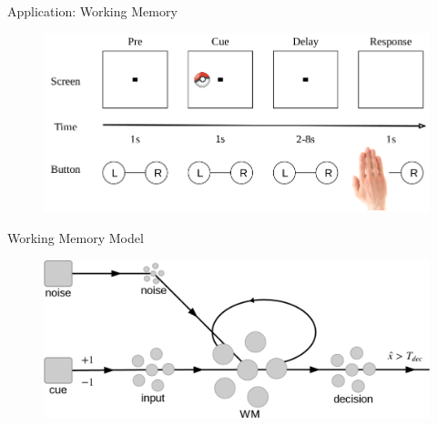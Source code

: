 \documentclass[aspectratio=169]{beamer}
\begin{document}
\begin{frame}{Application: Working Memory}
  \begin{figure}
  \centering
  \includegraphics[width=1.0\textwidth]{media/DRT_homemade.png}
  \end{figure}
\end{frame}

\begin{frame}{Working Memory Model}
    \begin{figure}
    \centering
    \includegraphics[width=1.0\textwidth]{media/sDRT_network.png}
    \end{figure}
\end{frame}
\end{document}
